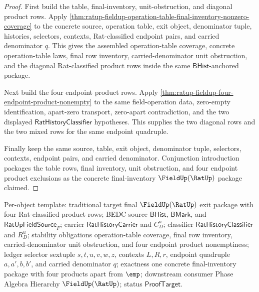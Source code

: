 \begin{proof}
First build the table, final-inventory, unit-obstruction, and diagonal product
rows. Apply
\autoref{thm:ratup-fieldup-operation-table-final-inventory-nonzero-coverage} to
the concrete source, operation table, exit object, denominator tuple, histories,
selectors, contexts, Rat-classified endpoint pairs, and carried denominator
$q$. This gives the assembled operation-table coverage, concrete
operation-table laws, final row inventory, carried-denominator unit obstruction,
and the diagonal Rat-classified product rows inside the same
$\mathsf{BHist}$-anchored package.

Next build the four endpoint product rows. Apply
\autoref{thm:ratup-fieldup-four-endpoint-product-nonempty} to the same
field-operation data, zero-empty identification, apart-zero transport,
zero-apart contradiction, and the two displayed
$\mathsf{RatHistoryClassifier}$ hypotheses. This supplies the two diagonal rows
and the two mixed rows for the same endpoint quadruple.

Finally keep the same source, table, exit object, denominator tuple, selectors,
contexts, endpoint pairs, and carried denominator. Conjunction introduction
packages the table rows, final inventory, unit obstruction, and four endpoint
product exclusions as the concrete final-inventory $\FieldUp(\RatUp)$ package
claimed.
\end{proof}

Per-object template: traditional target final $\FieldUp(\RatUp)$ exit package
with four Rat-classified product rows; BEDC source $\mathsf{BHist}$,
$\mathsf{BMark}$, and $\mathsf{RatUpFieldSource}_F$; carrier
$\mathsf{RatHistoryCarrier}$ and $C_D^u$; classifier
$\mathsf{RatHistoryClassifier}$ and $R_D^u$; stability obligations
operation-table coverage, final row inventory, carried-denominator unit
obstruction, and four endpoint product nonemptiness; ledger selector sextuple
$s,t,u,v,w,z$, contexts $L,R,r$, endpoint quadruple $a,a',b,b'$, and carried
denominator $q$; exactness one concrete final-inventory package with four
products apart from $\emp$; downstream consumer Phase Algebra Hierarchy
$\FieldUp(\RatUp)$; status $\mathsf{ProofTarget}$.

